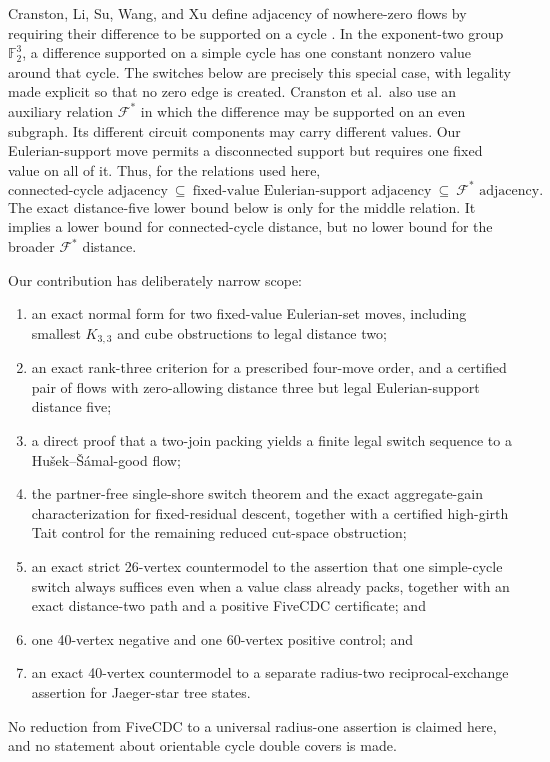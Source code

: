 \documentclass[11pt]{article}
\theoremstyle{definition}
\theoremstyle{remark}
\newcommand{\F}{\mathbb F}
\numberwithin{equation}{section}
\begin{document}
Cranston, Li, Su, Wang, and Xu define adjacency of nowhere-zero flows by
requiring their difference to be supported on a cycle
\cite{EsperetEtAl2026,CranstonEtAl2026}.  In the exponent-two group \(\F_2^3\), a
difference supported on a simple cycle has one constant nonzero value
around that cycle.  The switches below are precisely this special case,
with legality made explicit so that no zero edge is created.
Cranston et al.\ also use an auxiliary relation \(\mathcal F^*\) in
which the difference may be supported on an even subgraph.  Its
different circuit components may carry different values.  Our
Eulerian-support move permits a disconnected support but requires one
fixed value on all of it.  Thus, for the relations used here,
\[
 \text{connected-cycle adjacency}
 \ \subseteq\ \text{fixed-value Eulerian-support adjacency}
 \ \subseteq\ \mathcal F^*\text{ adjacency}.
\]
The exact distance-five lower bound below is only for the middle
relation.  It implies a lower bound for connected-cycle distance, but no
lower bound for the broader \(\mathcal F^*\) distance.

Our contribution has deliberately narrow scope:
\begin{enumerate}
\item an exact normal form for two fixed-value Eulerian-set moves,
      including smallest \(K_{3,3}\) and cube obstructions to legal
      distance two;
\item an exact rank-three criterion for a prescribed four-move order,
      and a certified pair of flows with zero-allowing distance three
      but legal Eulerian-support distance five;
\item a direct proof that a two-join packing yields a finite legal switch
      sequence to a Hu\v{s}ek--\v{S}\'amal-good flow;
\item the partner-free single-shore switch theorem and the exact
      aggregate-gain characterization for fixed-residual descent, together
      with a certified high-girth Tait control for the remaining reduced
      cut-space obstruction;
\item an exact strict 26-vertex countermodel to the assertion that one
      simple-cycle switch always suffices even when a value class already
      packs, together with an exact distance-two path and a positive
      FiveCDC certificate; and
\item one 40-vertex negative and one 60-vertex positive control; and
\item an exact 40-vertex countermodel to a separate radius-two
      reciprocal-exchange assertion for Jaeger-star tree states.
\end{enumerate}
No reduction from FiveCDC to a universal radius-one assertion is claimed
here, and no statement about orientable cycle double covers is made.
\end{document}
